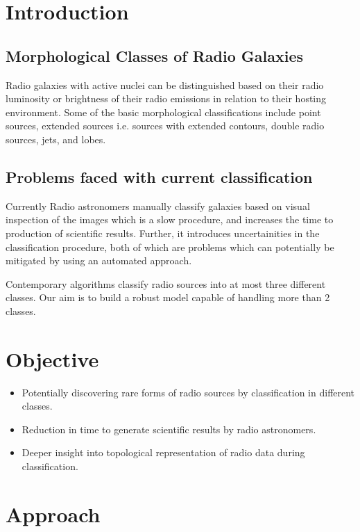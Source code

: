 \documentclass{article}
\begin{document}
\begin{multicols*}{2}
\section{Introduction}
\subsection{Morphological Classes of Radio Galaxies}

Radio galaxies with active nuclei can be distinguished based on their radio luminosity or brightness of their radio emissions in relation to their hosting environment. Some of the basic morphological classifications include point sources, extended sources i.e. sources with extended contours, double radio sources, jets, and lobes.


\subsection{Problems faced with current classification}

Currently Radio astronomers manually classify galaxies based on visual inspection of the images which is a slow procedure, and increases the time to production of scientific results. Further, it introduces uncertainities in the classification procedure, both of which are problems which can potentially be mitigated by using an automated approach.

Contemporary algorithms classify radio sources into at most three different classes. Our aim is to build a robust model capable of handling more than 2 classes.

\section{Objective}

\begin{itemize}
	\item Potentially discovering rare forms of radio sources by classification in different classes.
	\item Reduction in time to generate scientific results by radio astronomers.
	\item Deeper insight into topological representation of radio data during classification.
\end{itemize}

\section{Approach}


\end{multicols*}
\end{document}
